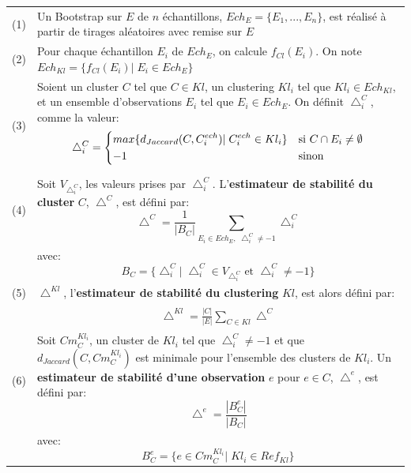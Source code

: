 \begin{longtable}{@{\hspace{-0.2cm}}p{}@{\hspace{-0.1cm}}p{}}
	(1) & \textrm{Un Bootstrap sur $E$ de $n$ échantillons, $Ech_{E}=\{E_{1},...,E_{n}\}$, est réalisé à partir de tirages aléatoires avec remise sur $E$}\\
	(2) & Pour chaque échantillon $E_{i}$ de $Ech_{E}$, on calcule $f_{Cl}(E_{i})$. \textrm{On note $Ech_{Kl}=\{f_{Cl}(E_{i})|\;  E_{i} \in Ech_{E}\}$}\\
	(3) & Soient un cluster $C$ tel que $C \in Kl$, un clustering $Kl_{i}$ tel que $Kl_{i} \in Ech_{Kl}$, et un ensemble d'observations $E_{i}$ tel que $E_{i} \in Ech_{E}$. On définit $\bigtriangleup_{i}^{C}$, comme la valeur:
	     	\begin{equation}
	     	\bigtriangleup_{i}^{C}=
				\begin{dcases}
			 	max\{d_{Jaccard}(C,C_{i}^{ech})|\; C_{i}^{ech} \in Kl_{i} \} & \textrm{si } C \cap E_{i} \neq\emptyset\\
			 	-1 & \textrm{sinon}
	 			\end{dcases}
	     	\end{equation}\\
	(4) & Soit $V_{\bigtriangleup_{i}^{C}}$, les valeurs prises par $\bigtriangleup_{i}^{C}$. L'\textbf{estimateur de stabilité du cluster} $C$, $\bigtriangleup^{C}$, est défini par:
	     	\begin{equation}
			\label{eqestimstabC}
			\bigtriangleup^{C}=\frac{1}{|B_{C}|}\sum_{E_{i} \in Ech_{E},\;\bigtriangleup_{i}^{C}\neq-1 }\bigtriangleup_{i}^{C}
	     	\end{equation}\\
	    & avec:
	     $$
		B_{C}=\{ \bigtriangleup_{i}^{C}|\; \bigtriangleup_{i}^{C}\in V_{\bigtriangleup_{i}^{C}} \textrm{ et }  \bigtriangleup_{i}^{C}\neq -1 \}
		$$\\
	(5) & $\bigtriangleup^{Kl}$, l'\textbf{estimateur de stabilité du clustering} $Kl$, est alors défini par:\\
	     &	\begin{equation}\label{eqestimstaball}
				\begin{split}
				\bigtriangleup^{Kl}=\frac{|C|}{|E|}\sum_{C \in Kl}\bigtriangleup^{C}
				\end{split}
	     	\end{equation}\\
	(6) & Soit $Cm^{Kl_{i}}_{C}$, un cluster de $Kl_{i}$ tel que $\bigtriangleup_{i}^{C}\neq-1$ et que $d_{Jaccard}(C,Cm^{Kl_{i}}_{C})$ est minimale pour l'ensemble des clusters de $Kl_{i}$. Un \textbf{estimateur de stabilité d'une observation} $e$ pour $e \in C$, $\bigtriangleup^{e}$, est défini par:
	     	\begin{equation}\label{eqestimstabr}
				\bigtriangleup^{e}=\frac{|B^{e}_{C}|}{|B_{C}|}
	     	\end{equation}\\
	     & avec:
		$$
		B^{e}_{C}=\{e \in Cm^{Kl_{i}}_{C}|\; Kl_{i} \in Ref_{Kl}\}
		$$\\
\end{longtable}

